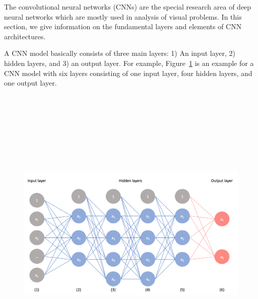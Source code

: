 The convolutional neural networks (CNNs) are the special research area of deep neural networks which are mostly used in analysis of visual problems. In this section, we give information on the fundamental layers and elements of CNN architectures. 

A CNN model basically consists of three main layers: 1) An input layer, 2) hidden layers, and 3) an output layer. For example, Figure~\ref{fig:basic_cnn_sample} is an example for a CNN model with six layers consisting of one input layer, four hidden layers, and one output layer.


\begin{figure}[h]
	\centering
	\includegraphics[width=14.5cm,height=14.5cm,keepaspectratio]{fig/basic_cnn_sample.png}
	\vspace*{1mm}
	\label{fig:basic_cnn_sample}
\end{figure}


